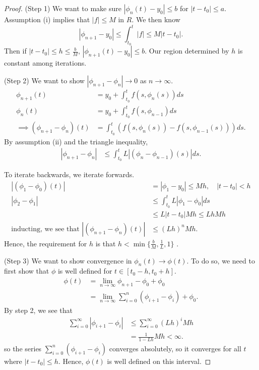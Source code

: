 \documentclass{tufte-handout}
\theoremstyle{definition}
\begin{document}
\begin{proof}
	(Step 1) We want to make sure $\left| \phi_n(t) - y_0 \right| \le b$ for $\left| t-t_0 \right| \le a$. Assumption (i) implies that $\left| f \right| \le M$ in $R$. We then know \[
		\left| \phi_{n+1} - y_0 \right| \le \int_{t_0}^{t} \left| f \right| \le M \left| t-t_0 \right|
	.\] Then if $\left| t-t_0 \right| \le h \le \frac{b}{M}$, $\left|\phi_{n+1}(t)-y_0\right| \le b$. Our region determined by $h$ is constant among iterations.

	(Step 2) We want to show $\left| \phi_{n+1} - \phi_n \right| \to 0$ as $n \to \infty$. 
	\begin{align*}
		\phi_{n+1}(t) &= y_0 + \int_{t_0}^{t} f(s,\phi_n(s)) ds \\ 
		\phi_{n} (t) &= y_0 + \int_{t_0}^{t} f(s,\phi_{n-1}) ds  \\
		\implies \left( \phi_{n+1} - \phi_n \right)(t) &= \int_{t_0}^{t} \left( f(s,\phi_n(s)) - f(s,\phi_{n-1}(s)) \right)ds
	.\end{align*}
	By assumption (ii) and the triangle inequality,
	\begin{align*}
		\left| \phi_{n+1} - \phi_n \right| &\le \int_{t_0}^{t} L \left| (\phi_n - \phi_{n-1})(s) \right|ds
	.\end{align*}
	
	To iterate backwards, we iterate forwards.
	\begin{align*}
		\left| (\phi_1 - \phi_0)(t) \right| &= \left| \phi_1 - y_0 \right| \le Mh, \quad \left| t-t_0 \right| < h \\
		\left| \phi_2-\phi_1 \right| &\le \int_{t_0}^{t} L \left| \phi_1 - \phi_0 \right|ds \\  
									 &\le L \left| t-t_0 \right| Mh \le Lh Mh \\
		\text{inducting, we see that } \left| \left( \phi_{n+1} - \phi_n \right)(t) \right| &\le \left( Lh \right)^n Mh
	.\end{align*}
	Hence, the requirement for $h$ is that $h < \min\{\frac{b}{M}, \frac{1}{L}, 1\} $ .

	(Step 3) We want to show convergence in $\phi_n(t) \to \phi(t)$. To do so, we need to first show that $\phi$ is well defined for $t \in [t_0-h, t_0+h]$.
	\begin{align*}
		\phi(t) &= \lim\limits_{n \to \infty} \phi_{n+1} - \phi_0 + \phi_0 \\
				&= \lim\limits_{n \to \infty} \sum\limits_{i=0}^{n} \left( \phi_{i+1} - \phi_i \right) + \phi_0
	.\end{align*}
	By step 2, we see that
	\begin{align*}
		\sum\limits_{i=0}^{\infty} \left| \phi_{i+1} - \phi_i \right| &\le \sum\limits_{i=0}^{\infty} \left( Lh \right)^{i} Mh \\
		&= \frac{1}{1-Lh} Mh < \infty
	.\end{align*} so the series $\sum\limits_{i=0}^{n} \left( \phi_{i+1} - \phi_i \right)$ converges absolutely, so it converges for all $t$ where $\left| t-t_0 \right| \le h$. Hence, $\phi(t)$ is well defined on this interval.


\end{proof}
\end{document}
